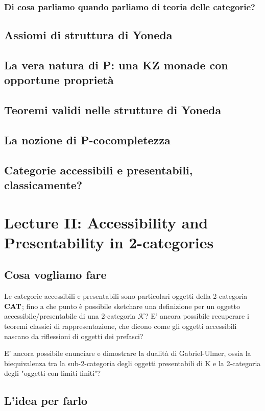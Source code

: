 \documentclass[11pt]{article}
\theoremstyle{reference}
\begin{document}
\subsubsection{Di cosa parliamo quando parliamo di teoria delle categorie?}
\label{sec:org12570a5}
\subsection{Assiomi di struttura di Yoneda}
\label{sec:orga3a215c}
\subsection{La vera natura di P: una KZ monade con opportune proprietà}
\label{sec:org8a07368}
\subsection{Teoremi validi nelle strutture di Yoneda}
\label{sec:orgb9f0a24}
\subsection{La nozione di P-cocompletezza}
\label{sec:orgc9e386a}
\subsection{Categorie accessibili e presentabili, classicamente?}
\label{sec:orgb7f855d}
\section{Lecture II: Accessibility and Presentability in 2-categories}
\label{sec:orge7b98a1}
\subsection{Cosa vogliamo fare}
\label{sec:org4881c98}
Le categorie accessibili e presentabili sono particolari
oggetti della 2-categoria \(\bf CAT\); fino a che punto è possibile
sketchare una definizione per un oggetto
accessibile/presentabile di una 2-categoria \(\mathcal K\)? E' ancora
possibile recuperare i teoremi classici di rappresentazione,
che dicono come gli oggetti accessibili nascano da
riflessioni di oggetti dei prefasci?

E' ancora possibile enunciare e dimostrare la dualità di
Gabriel-Ulmer, ossia la biequivalenza tra la sub-2-categoria
degli oggetti presentabili di K e la 2-categoria degli
"oggetti con limiti finiti"?

\subsection{L'idea per farlo}
\label{sec:org9dbae78}
\end{document}
